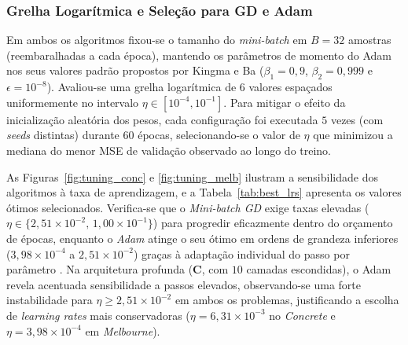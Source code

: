 \documentclass[conference]{IEEEtran}
\begin{document}
\subsubsection{Grelha Logarítmica e Seleção para GD e Adam}
Em ambos os algoritmos fixou-se o tamanho do \textit{mini-batch} em $B = 32$ amostras (reembaralhadas a cada época), mantendo os parâmetros de momento do Adam nos seus valores padrão propostos por Kingma e Ba \cite{b5} ($\beta_1 = 0{,}9$, $\beta_2 = 0{,}999$ e $\epsilon = 10^{-8}$). Avaliou-se uma grelha logarítmica de $6$ valores espaçados uniformemente no intervalo $\eta \in [10^{-4}, 10^{-1}]$. Para mitigar o efeito da inicialização aleatória dos pesos, cada configuração foi executada $5$ vezes (com \textit{seeds} distintas) durante $60$ épocas, selecionando-se o valor de $\eta$ que minimizou a mediana do menor MSE de validação observado ao longo do treino.

As Figuras~\ref{fig:tuning_conc} e \ref{fig:tuning_melb} ilustram a sensibilidade dos algoritmos à taxa de aprendizagem, e a Tabela~\ref{tab:best_lrs} apresenta os valores ótimos selecionados. Verifica-se que o \textit{Mini-batch GD} exige taxas elevadas ($\eta \in \{2{,}51 \times 10^{-2},\, 1{,}00 \times 10^{-1}\}$) para progredir eficazmente dentro do orçamento de épocas, enquanto o \textit{Adam} atinge o seu ótimo em ordens de grandeza inferiores ($3{,}98 \times 10^{-4}$ a $2{,}51 \times 10^{-2}$) graças à adaptação individual do passo por parâmetro \cite{b5}. Na arquitetura profunda (\textbf{C}, com $10$ camadas escondidas), o Adam revela acentuada sensibilidade a passos elevados, observando-se uma forte instabilidade para $\eta \ge 2{,}51 \times 10^{-2}$ em ambos os problemas, justificando a escolha de \textit{learning rates} mais conservadoras ($\eta = 6{,}31 \times 10^{-3}$ no \textit{Concrete} e $\eta = 3{,}98 \times 10^{-4}$ em \textit{Melbourne}).
\end{document}
